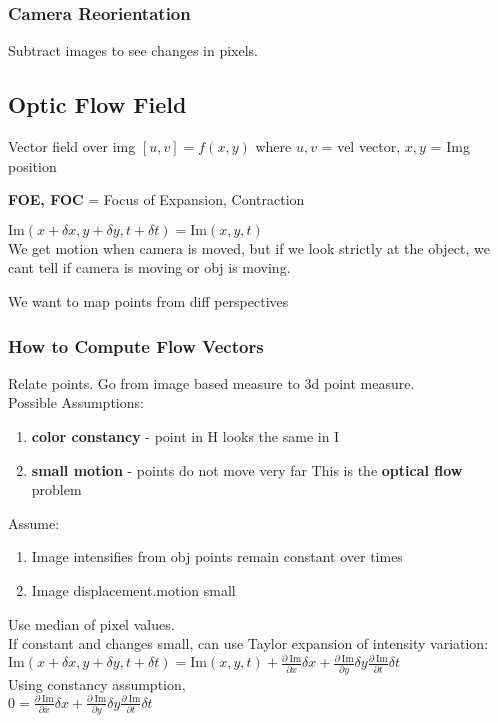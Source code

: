 \documentclass{article}
\begin{document}
\subsubsection{Camera Reorientation}
Subtract images to see changes in pixels. 
\subsection{Optic Flow Field}
Vector field over img $[u, v] = f(x, y)$ where $u, v$ = vel vector, $x, y$ = Img position
\begin{expln}
{}{}
\textbf{FOE, FOC} = Focus of Expansion, Contraction
\end{expln}
$\mathrm{Im}(x + \delta x, y + \delta y, t + \delta t) = \mathrm{Im}(x, y, t)$\\[5pt]
We get motion when camera is moved, but if we look strictly at the object, we cant tell if camera is moving or obj is moving. 
\begin{list}{}{}
    \item We want to map points from diff perspectives
\end{list}
\subsubsection{How to Compute Flow Vectors}
Relate points. Go from image based measure to 3d point measure.\\
Possible Assumptions:
\begin{enumerate}
    \item \textbf{color constancy} - point in H looks the same in I
    \item \textbf{small motion} - points do not move very far
    \subitem This is the \textbf{optical flow} problem
\end{enumerate}

Assume:
\begin{enumerate}
    \item Image intensifies from obj points remain constant over times
    \item Image displacement.motion small
\end{enumerate}
Use median of pixel values. \\
If constant and changes small, can use Taylor expansion of intensity variation:
\\[5pt]
$\mathrm{Im}(x + \delta x, y + \delta y, t + \delta t) = \mathrm{Im}(x, y, t) 
+ \frac{ \partial \ \mathrm{Im}}{\partial x}\delta x 
+ \frac{ \partial \ \mathrm{Im}}{\partial y}\delta y
\frac{ \partial \ \mathrm{Im}}{\partial t}\delta t
$
\\[5pt]
Using constancy assumption, \\[5pt]
$0 =  \frac{ \partial \ \mathrm{Im}}{\partial x}\delta x 
+ \frac{ \partial \ \mathrm{Im}}{\partial y}\delta y
\frac{ \partial \ \mathrm{Im}}{\partial t}\delta t$
\end{document}
